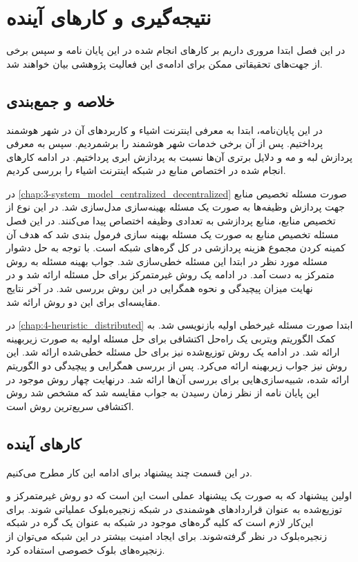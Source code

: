 \chapter{نتیجه‌گیری و کار‌های آینده}\label{chap:conclusion}
  \thispagestyle{empty}
  در این فصل ابتدا مروری داریم بر کار‌های انجام شده در این پایان نامه و سپس برخی از جهت‌های تحقیقاتی ممکن برای ادامه‌ی این فعالیت پژوهشی بیان خواهند شد.

  \section{خلاصه و جمع‌بندی}
    در این پایان‌نامه، ابتدا به معرفی اینترنت اشیاء و کاربرد‌های آن در شهر هوشمند پرداختیم.
    پس از آن برخی خدمات شهر هوشمند را برشمردیم.
    سپس به معرفی پردازش لبه و مه و دلایل برتری آن‌ها نسبت به پردازش ابری پرداختیم.
    در ادامه کار‌های انجام شده در اختصاص منابع در شبکه اینترنت اشیاء را بررسی کردیم.

    در \cref{chap:3-system_model_centralized_decentralized} صورت مسئله تخصیص منابع جهت پردازش وظیفه‌ها به صورت یک مسئله بهینه‌سازی مدل‌سازی شد. 
    در این نوع از تخصیص منابع، منابع پردازشی به تعدادی وظیفه اختصاص پیدا می‌کنند.
    در این فصل مسئله تخصیص منابع به صورت یک مسئله بهینه سازی فرمول بندی شد که هدف آن کمینه کردن مجموع هزینه پردازشی در کل گره‌های شبکه است.
    با توجه به حل دشوار مسئله مورد نظر در ابتدا این مسئله خطی‌سازی شد. جواب بهینه مسئله به روش متمرکز به دست آمد.
    در ادامه یک روش غیرمتمرکز برای حل مسئله ارائه شد و در نهایت میزان پیچیدگی و نحوه همگرایی در این روش بررسی شد. در آخر نتایج مقایسه‌ای برای این دو روش ارائه شد.

    در \cref{chap:4-heuristic_distributed} ابتدا صورت مسئله غیرخطی اولیه بازنویسی شد.
    به کمک الگوریتم ویتربی یک راه‌حل اکتشافی برای حل مسئله اولیه به صورت زیر‌بهینه ارائه شد.
	در ادامه یک روش توزیع‌شده نیز برای حل مسئله خطی‌‌شده ارائه شد. این روش نیز جواب زیربهینه ارائه می‌کرد. 
    پس از بررسی همگرایی و پیچیدگی دو الگوریتم ارائه شده، شبیه‌سازی‌هایی برای بررسی آن‌ها ارائه شد.
    درنهایت چهار روش موجود در این پایان نامه از نظر زمان رسیدن به جواب مقایسه شد که مشخص شد روش اکتشافی سریع‌ترین روش است. 

  \section{کار‌های آینده}
    در این قسمت چند پیشنهاد برای ادامه این کار مطرح می‌کنیم.
  
  اولین پیشنهاد که به صورت یک پیشنهاد عملی است این است که دو روش غیرمتمرکز و توزیع‌شده به عنوان قراردادهای هوشمندی در شبکه زنجیره‌‌بلوک عملیاتی شوند. برای این‌کار لازم است که کلیه گره‌های موجود در شبکه به عنوان یک گره در شبکه زنجیره‌بلوک در نظر گرفته‌شوند. برای ایجاد امنیت بیشتر در این شبکه می‌توان از زنجیره‌های بلوک خصوصی استفاده کرد.
  

